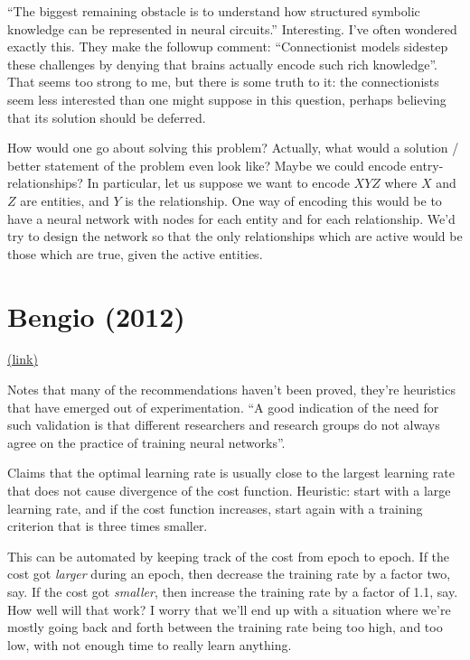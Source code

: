 \documentclass[12pt]{report}
\newcommand{\link}[2]{\href{#1}{#2}}
\begin{document}
``The biggest remaining obstacle is to understand how structured
symbolic knowledge can be represented in neural circuits.''
Interesting.  I've often wondered exactly this.  They make the
followup comment: ``Connectionist models sidestep these challenges by
denying that brains actually encode such rich knowledge''.  That seems
too strong to me, but there is some truth to it: the connectionists
seem less interested than one might suppose in this question, perhaps
believing that its solution should be deferred.

How would one go about solving this problem?  Actually, what would a
solution / better statement of the problem even look like?  Maybe we
could encode entry-relationships?  In particular, let us suppose we
want to encode $X Y Z$ where $X$ and $Z$ are entities, and $Y$ is the
relationship.  One way of encoding this would be to have a neural
network with nodes for each entity and for each relationship.  We'd
try to design the network so that the only relationships which are
active would be those which are true, given the active entities.

\section{Bengio (2012)} 

\link{http://arxiv.org/abs/1206.5533}{(link)}

Notes that many of the recommendations haven't been proved, they're
heuristics that have emerged out of experimentation.  ``A good
indication of the need for such validation is that different
researchers and research groups do not always agree on the practice of
training neural networks''.

Claims that the optimal learning rate is usually close to the largest
learning rate that does not cause divergence of the cost function.
Heuristic: start with a large learning rate, and if the cost function
increases, start again with a training criterion that is three times
smaller.

This can be automated by keeping track of the cost from epoch to
epoch.  If the cost got \emph{larger} during an epoch, then decrease
the training rate by a factor two, say.  If the cost got
\emph{smaller}, then increase the training rate by a factor of 1.1,
say.  How well will that work?  I worry that we'll end up with a
situation where we're mostly going back and forth between the training
rate being too high, and too low, with not enough time to really learn
anything.
\end{document}
